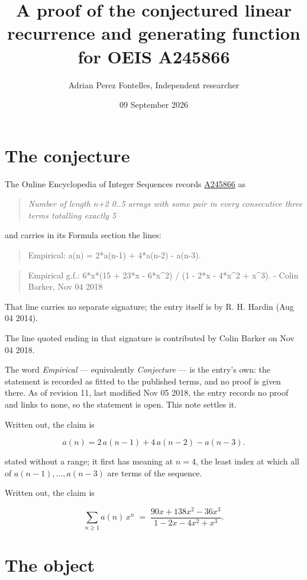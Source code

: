 \documentclass[11pt]{article}
\title{A proof of the conjectured linear recurrence and generating function for OEIS A245866}
\author{Adrian Perez Fontelles, Independent researcher}
\date{09 September 2026}
\theoremstyle{definition}
\begin{document}
\maketitle
\section{The conjecture}

The Online Encyclopedia of Integer Sequences records \href{https://oeis.org/A245866}{A245866} as

\begin{quote}\itshape Number of length n+2 0..5 arrays with some pair in every consecutive three terms totalling exactly 5\end{quote}

and carries in its Formula section the lines:

\begin{quote}\ttfamily Empirical: a(n) = 2*a(n-1) + 4*a(n-2) - a(n-3).\end{quote}

\begin{quote}\ttfamily Empirical g.f.: 6*x*(15 + 23*x - 6*x\textasciicircum{}2) / (1 - 2*x - 4*x\textasciicircum{}2 + x\textasciicircum{}3). - Colin Barker, Nov 04 2018\end{quote}

That line carries no separate signature; the entry itself is by R. H. Hardin (Aug 04 2014).

The line quoted ending in that signature is contributed by Colin Barker on Nov 04 2018.

The word {\itshape Empirical} --- equivalently {\itshape Conjecture} --- is the entry's own: the statement is recorded as fitted to the published terms, and no proof is given there. As of revision 11, last modified Nov 05 2018, the entry records no proof and links to none, so the statement is open. This note settles it.

Written out, the claim is

\[a(n) = 2\,a(n-1) + 4\,a(n-2) - a(n-3).\]

stated without a range; it first has meaning at $n = 4$, the least index at which all of $a(n-1),\dots,a(n-3)$ are terms of the sequence.

Written out, the claim is

\[\sum_{n \ge 1} a(n)\,x^n \;=\; \frac{90x + 138x^{2} - 36x^{3}}{1 - 2x - 4x^{2} + x^{3}}.\]

\section{The object}
\end{document}

